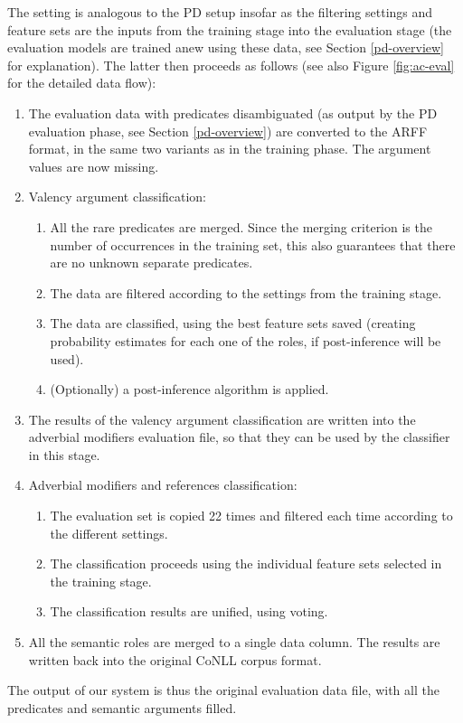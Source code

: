 \documentclass[12pt,notitlepage]{report}
\begin{document}
The setting is analogous to the PD setup insofar as the filtering settings and feature sets are the inputs from the training stage into the evaluation stage (the evaluation models are trained anew using these data, see Section \ref{pd-overview} for explanation). The latter then proceeds as follows (see also Figure \ref{fig:ac-eval} for the detailed data flow):
\begin{enumerate}
    \item The evaluation data with predicates disambiguated (as output by the PD evaluation phase, see Section \ref{pd-overview}) are converted to the ARFF format, in the same two variants as in the training phase. The argument values are now missing.
    \item Valency argument classification:
    \begin{enumerate}
        \item All the rare predicates are merged. Since the merging criterion is the number of occurrences in the training set, this also guarantees that there are no unknown separate predicates.
        \item The data are filtered according to the settings from the training stage.
        \item The data are classified, using the best feature sets saved (creating probability estimates for each one of the roles, if post-inference will be used).
        \item (Optionally) a post-inference algorithm is applied.
    \end{enumerate}
    \item The results of the valency argument classification are written into the adverbial modifiers evaluation file, so that they can be used by the classifier in this stage.
    \item Adverbial modifiers and references classification:
    \begin{enumerate}
        \item The evaluation set is copied 22 times and filtered each time according to the different settings.
        \item The classification proceeds using the individual feature sets selected in the training stage.
        \item The classification results are unified, using voting.
    \end{enumerate}
    \item All the semantic roles are merged to a single data column. The results are written back into the original CoNLL corpus format.
\end{enumerate}
The output of our system is thus the original evaluation data file, with all the predicates and semantic arguments filled.
\end{document}
